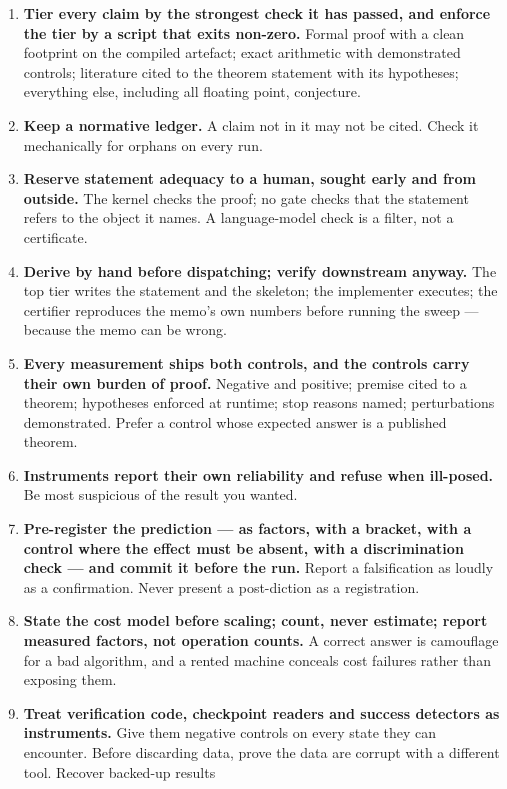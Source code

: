 \documentclass[11pt]{article}
\begin{document}
\begin{enumerate}[leftmargin=*,itemsep=2pt]
\item \textbf{Tier every claim by the strongest check it has passed, and enforce the tier by
  a script that exits non-zero.} Formal proof with a clean footprint on the compiled artefact;
  exact arithmetic with demonstrated controls; literature cited to the theorem statement with
  its hypotheses; everything else, including all floating point, conjecture.
\item \textbf{Keep a normative ledger.} A claim not in it may not be cited. Check it
  mechanically for orphans on every run.
\item \textbf{Reserve statement adequacy to a human, sought early and from outside.} The kernel
  checks the proof; no gate checks that the statement refers to the object it names. A
  language-model check is a filter, not a certificate.
\item \textbf{Derive by hand before dispatching; verify downstream anyway.} The top tier writes
  the statement and the skeleton; the implementer executes; the certifier reproduces the memo's
  own numbers before running the sweep --- because the memo can be wrong.
\item \textbf{Every measurement ships both controls, and the controls carry their own burden
  of proof.} Negative and positive; premise cited to a theorem; hypotheses enforced at runtime;
  stop reasons named; perturbations demonstrated. Prefer a control whose expected answer is a
  published theorem.
\item \textbf{Instruments report their own reliability and refuse when ill-posed.} Be most
  suspicious of the result you wanted.
\item \textbf{Pre-register the prediction --- as factors, with a bracket, with a control where
  the effect must be absent, with a discrimination check --- and commit it before the run.}
  Report a falsification as loudly as a confirmation. Never present a post-diction as a
  registration.
\item \textbf{State the cost model before scaling; count, never estimate; report measured
  factors, not operation counts.} A correct answer is camouflage for a bad algorithm, and a
  rented machine conceals cost failures rather than exposing them.
\item \textbf{Treat verification code, checkpoint readers and success detectors as
  instruments.} Give them negative controls on every state they can encounter. Before
  discarding data, prove the data are corrupt with a different tool. Recover backed-up results

\end{enumerate}
\end{document}
